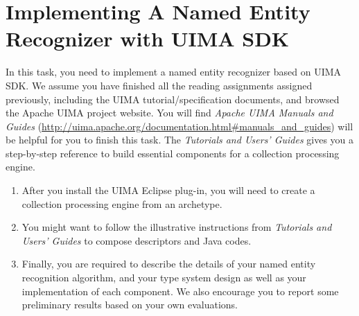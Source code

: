 
\chapter{Implementing A Named Entity Recognizer with UIMA SDK}

In this task, you need to implement a named entity recognizer based on UIMA SDK.
We assume you have finished all the reading assignments assigned previously, including the
UIMA tutorial/specification documents, and browsed the Apache UIMA project website. You will find
\emph{Apache UIMA Manuals and Guides}
(\url{http://uima.apache.org/documentation.html#manuals_and_guides}) will be
helpful for you to finish this task. The \emph{Tutorials and Users' Guides}
gives you a step-by-step reference to build essential components for a
collection processing engine.

\begin{enumerate}

\item After you install the UIMA Eclipse plug-in, you will need to create a
collection processing engine from an archetype.

\item You might want to follow the illustrative instructions from
\emph{Tutorials and Users' Guides} to compose descriptors and Java codes.

\item Finally, you are required to describe the details of your named entity
recognition algorithm, and your type system design as well as your
implementation of each component. We also encourage you to report some
preliminary results based on your own evaluations.

\end{enumerate}








